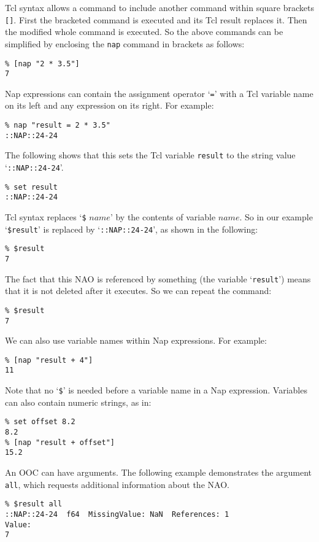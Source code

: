   

Tcl syntax allows a command to include another command within
  square brackets 
  \texttt{[]}. First the bracketed command is executed and its Tcl
  result replaces it. Then the modified whole command is executed. So
  the above commands can be simplified by enclosing the 
  \texttt{nap} command in brackets as follows:
  \begin{verbatim}
% [nap "2 * 3.5"]
7
\end{verbatim}

  

Nap expressions can contain the assignment operator `\texttt{=}' with a Tcl variable name on its left and any
  expression on its right. For example:
  \begin{verbatim}
% nap "result = 2 * 3.5"
::NAP::24-24
\end{verbatim}

The following shows that this sets the Tcl variable 
  \texttt{result} to the string value `\texttt{::NAP::24-24}'.
  \begin{verbatim}
% set result
::NAP::24-24
\end{verbatim}

Tcl syntax replaces `\texttt{\$}
  $name$' by the contents of variable 
  $name$. So in our example `\texttt{\$result}' is replaced by `\texttt{::NAP::24-24}', as shown in the following:
  \begin{verbatim}
% $result
7
\end{verbatim}

The fact that this NAO is referenced by something (the variable
`\texttt{result}') means that it is not deleted after it
  executes. So we can repeat the command:
  \begin{verbatim}
% $result
7
\end{verbatim}

We can also use variable names within Nap expressions. For
example:
  \begin{verbatim}
% [nap "result + 4"]
11
\end{verbatim}

Note that no `\texttt{\$}' is needed before a variable name in a Nap expression.
Variables can also contain numeric strings, as in:
  \begin{verbatim}
% set offset 8.2
8.2
% [nap "result + offset"]
15.2
\end{verbatim}

  

An OOC can have arguments. The following example demonstrates the
  argument 
  \texttt{all}, which requests additional information about the
  NAO.
  \begin{verbatim}
% $result all
::NAP::24-24  f64  MissingValue: NaN  References: 1
Value:
7
\end{verbatim}

